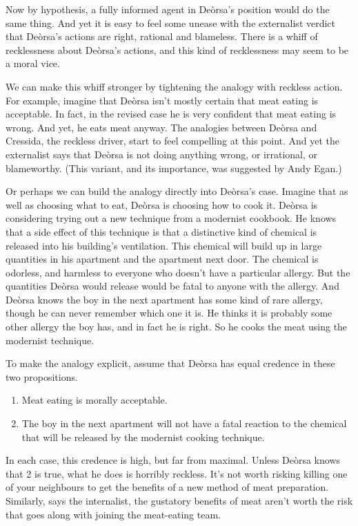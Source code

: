 Now by hypothesis, a fully informed agent in Deòrsa's position would do the same thing. And yet it is easy to feel some unease with the externalist verdict that Deòrsa's actions are right, rational and blameless. There is a whiff of recklessness about Deòrsa's actions, and this kind of recklessness may seem to be a moral vice.

We can make this whiff stronger by tightening the analogy with reckless action. For example, imagine that Deòrsa isn't mostly certain that meat eating is acceptable. In fact, in the revised case he is very confident that meat eating is wrong. And yet, he eats meat anyway. The analogies between Deòrsa and \gls{Cressida}, the reckless driver, start to feel compelling at this point. And yet the externalist says that Deòrsa is not doing anything wrong, or irrational, or blameworthy. (This variant, and its importance, was suggested by Andy Egan.)

Or perhaps we can build the analogy directly into Deòrsa's case. Imagine that as well as choosing what to eat, Deòrsa is choosing how to cook it. Deòrsa is considering trying out a new technique from a modernist cookbook. He knows that a side effect of this technique is that a distinctive kind of chemical is released into his building's ventilation. This chemical will build up in large quantities in his apartment and the apartment next door. The chemical is odorless, and harmless to everyone who doesn't have a particular allergy. But the quantities Deòrsa would release would be fatal to anyone with the allergy. And Deòrsa knows the boy in the next apartment has some kind of rare allergy, though he can never remember which one it is. He thinks it is probably some other allergy the boy has, and in fact he is right. So he cooks the meat using the modernist technique.

To make the analogy explicit, assume that Deòrsa has equal credence in these two propositions.

\begin{enumerate}
\item{} Meat eating is morally acceptable.

\item{} The boy in the next apartment will not have a fatal reaction to the chemical that will be released by the modernist cooking technique.

\end{enumerate}
In each case, this credence is high, but far from maximal. Unless Deòrsa knows that 2 is true, what he does is horribly reckless. It's not worth risking killing one of your neighbours to get the benefits of a new method of meat preparation. Similarly, says the internalist, the gustatory benefits of meat aren't worth the risk that goes along with joining the meat-eating team.

